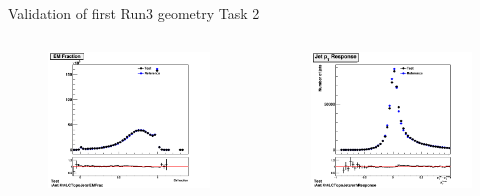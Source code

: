 \begin{frame}{Validation of first Run3 geometry Task 2}
    \begin{columns}
        \begin{column}{0.5\textwidth}
            \begin{figure}
                \centering
                \includegraphics[width = \textwidth]{812_2_EMFrac}
            \end{figure}
        \end{column}
        \begin{column}{0.5\textwidth}
            \begin{figure}
                \centering
                \includegraphics[width = \textwidth]{812_2_erhResponse}

\end{figure}
\end{column}
\end{columns}
\end{frame}
